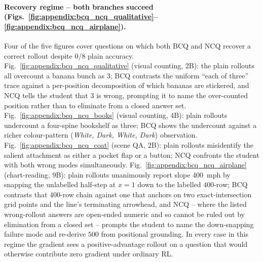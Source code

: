 \paragraph{Recovery regime -- both branches succeed (Figs.~\ref{fig:appendix:bcq_ncq_qualitative}--\ref{fig:appendix:bcq_ncq_airplane}).}
Four of the five figures cover questions on which both BCQ and NCQ recover a correct rollout despite $0$/$8$ plain accuracy. Fig.~\ref{fig:appendix:bcq_ncq_qualitative} (visual counting, $2$B): the plain rollouts all overcount a banana bunch as $3$; BCQ contrasts the uniform ``each of three'' trace against a per-position decomposition of which bananas are stickered, and NCQ tells the student that $3$ is wrong, prompting it to name the over-counted position rather than to eliminate from a closed answer set. Fig.~\ref{fig:appendix:bcq_ncq_books} (visual counting, $4$B): plain rollouts undercount a four-spine bookshelf as three; BCQ shows the undercount against a richer colour-pattern (\emph{White, Dark, White, Dark}) observation. Fig.~\ref{fig:appendix:bcq_ncq_coat} (scene QA, $2$B): plain rollouts misidentify the salient attachment as either a pocket flap or a button; NCQ confronts the student with both wrong modes simultaneously. Fig.~\ref{fig:appendix:bcq_ncq_airplane} (chart-reading, $9$B): plain rollouts unanimously report slope $400$~mph by snapping the unlabelled half-step at $x\!=\!1$ down to the labelled $400$-row; BCQ contrasts that $400$-row chain against one that anchors on two exact-intersection grid points and the line's terminating arrowhead, and NCQ -- where the listed wrong-rollout answers are open-ended numeric and so cannot be ruled out by elimination from a closed set -- prompts the student to name the down-snapping failure mode and re-derive $500$ from positional grounding. In every case in this regime the gradient sees a positive-advantage rollout on a question that would otherwise contribute zero gradient under ordinary RL.






